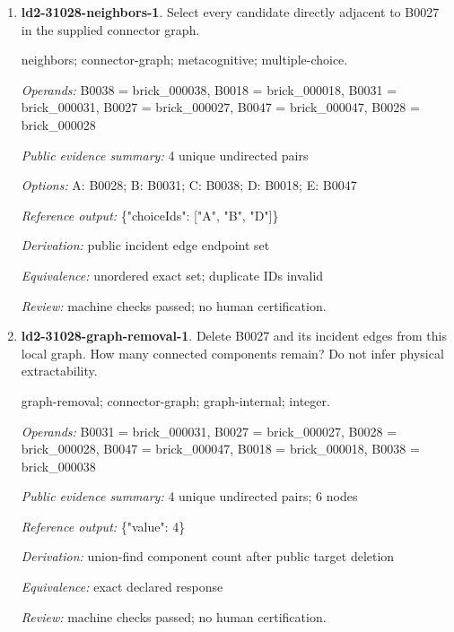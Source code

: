 \begin{enumerate}
\par{\small interface; connector-graph; metacognitive; single-choice.\par\textit{Operands:} B0044 = brick\_000044, B0042 = brick\_000042\par\textit{Public evidence summary:} \{"connectorRecord": \{"family": "stud", "aConnector": 11, "bConnector": 10\}, "scope": "Upstream connector tolerances and inset mesh intersections; unknown parts remain explicit, separate scene objects are not glued together; no load/force validation."\}\par\textit{Options:} A: fixed; B: ball; C: stud; D: hinge; E: axle\par\textit{Reference output:} \{"choiceId": "C"\}\par\textit{Derivation:} public connectorRecord.family equality\par\textit{Equivalence:} exact declared response\par\textit{Review:} machine checks passed; no human certification.}
\item \textbf{ld2-31028-neighbors-1}. Select every candidate directly adjacent to B0027 in the supplied connector graph.
\par{\small neighbors; connector-graph; metacognitive; multiple-choice.\par\textit{Operands:} B0038 = brick\_000038, B0018 = brick\_000018, B0031 = brick\_000031, B0027 = brick\_000027, B0047 = brick\_000047, B0028 = brick\_000028\par\textit{Public evidence summary:} 4 unique undirected pairs\par\textit{Options:} A: B0028; B: B0031; C: B0038; D: B0018; E: B0047\par\textit{Reference output:} \{"choiceIds": ["A", "B", "D"]\}\par\textit{Derivation:} public incident edge endpoint set\par\textit{Equivalence:} unordered exact set; duplicate IDs invalid\par\textit{Review:} machine checks passed; no human certification.}
\item \textbf{ld2-31028-graph-removal-1}. Delete B0027 and its incident edges from this local graph. How many connected components remain? Do not infer physical extractability.
\par{\small graph-removal; connector-graph; graph-internal; integer.\par\textit{Operands:} B0031 = brick\_000031, B0027 = brick\_000027, B0028 = brick\_000028, B0047 = brick\_000047, B0018 = brick\_000018, B0038 = brick\_000038\par\textit{Public evidence summary:} 4 unique undirected pairs; 6 nodes\par\textit{Reference output:} \{"value": 4\}\par\textit{Derivation:} union-find component count after public target deletion\par\textit{Equivalence:} exact declared response\par\textit{Review:} machine checks passed; no human certification.}

\end{enumerate}

